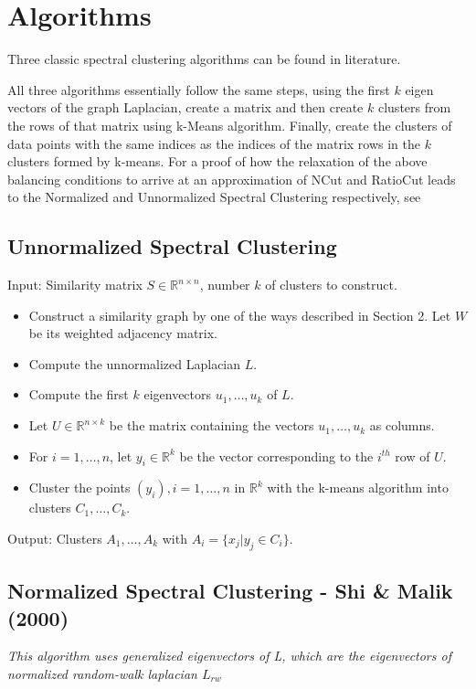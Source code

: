 \documentclass[10pt,a4paper, nocenter]{report}
\begin{document}
    \section{Algorithms}

    Three classic spectral clustering algorithms can be found in literature.

    All three algorithms essentially follow the same steps, using the first $k$ eigen vectors of the graph Laplacian, create a matrix and then create $k$ clusters from the rows of that matrix using k-Means algorithm. Finally, create the clusters of data points with the same indices as the indices of the matrix rows in the $k$ clusters formed by k-means. For a proof of how the relaxation of the above balancing conditions to arrive at an approximation of NCut and RatioCut leads to the Normalized and Unnormalized Spectral Clustering respectively, see \cite{Luxburg2007}
	
	\subsection{Unnormalized Spectral Clustering}
	
	Input: Similarity matrix $S \in \mathbb{R}^{n\times n}$, number $k$ of clusters to construct.
	\begin{itemize}
		\item Construct a similarity graph by one of the ways described in Section 2. Let $W$ be its weighted adjacency matrix.
		\item Compute the unnormalized Laplacian $L$.
		\item Compute the first $k$ eigenvectors $u_{1},\dots, u_{k} $ of $L$.
		\item Let $U \in \mathbb{R}^{n\times k}$ be the matrix containing the vectors $u_{1},\dots, u_{k}$ as columns.
		\item For $i = 1,\dots, n$, let $y_{i} \in \mathbb{R}^k$ be the vector corresponding to the $i^{th}$ row of $U$.
		\item Cluster the points $(y_{i}), i=1,\dots,n$ in $\mathbb{R}^k$ with the k-means algorithm into clusters
		$C_{1},\dots, C_{k}$.
	\end{itemize}
	Output: Clusters $A_{1},\dots, A_{k}$ with $A_{i} = \{x_{j}| y_{j} \in C_{i}\}$.
	

	\subsection{Normalized Spectral Clustering - Shi \& Malik (2000)\cite{Shi-Malik-maxcut-00}}
	\textit{This algorithm uses generalized eigenvectors of L, which are the eigenvectors of normalized random-walk laplacian $L_{rw}$}
	
\end{document}
